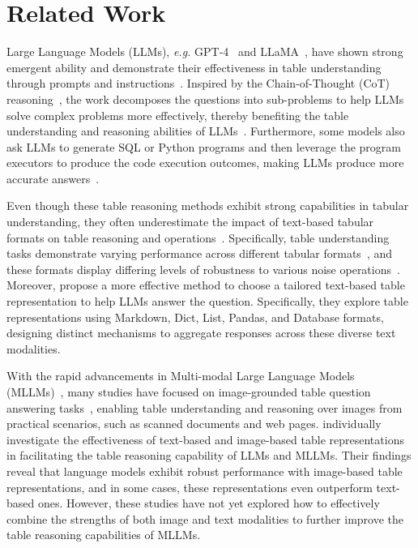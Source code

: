 \section{Related Work}
Large Language Models (LLMs), \textit{e.g.} GPT-4~\cite{openai2023gpt} and LLaMA~\cite{touvron2023llama}, have shown strong emergent ability and demonstrate their effectiveness in table understanding through prompts and instructions~\cite{chen2023large,wang2024chainoftable}. Inspired by the Chain-of-Thought (CoT) reasoning~\cite{wei2022chain}, the work decomposes the questions into sub-problems to help LLMs solve complex problems more effectively, thereby benefiting the table understanding and reasoning abilities of LLMs~\cite{zhou2022least,wang2024chainoftable,cheng2023binding}. Furthermore, some models also ask LLMs to generate SQL or Python programs and then leverage the program executors to produce the code execution outcomes, making LLMs produce more accurate answers~\cite{cheng2023binding,ye2023large,gao2023pal,ni2023lever}.

Even though these table reasoning methods exhibit strong capabilities in tabular understanding, they often underestimate the impact of text-based tabular formats on table reasoning and operations~\cite{sui2024table,singha2023tabular}. Specifically, table understanding tasks demonstrate varying performance across different tabular formats~\cite{sui2024table}, and these formats display differing levels of robustness to various noise operations~\cite{singha2023tabular}. Moreover, \citet{zhang2024flextaf} propose a more effective method to choose a tailored text-based table representation to help LLMs answer the question. Specifically, they explore table representations using Markdown, Dict, List, Pandas, and Database formats, designing distinct mechanisms to aggregate responses across these diverse text modalities.



With the rapid advancements in Multi-modal Large Language Models (MLLMs)~\cite{yao2024minicpm,bai2023qwen,liu2024improved}, many studies have focused on image-grounded table question answering tasks~\cite{kim2024tablevqa,ZhengFSS0J024}, enabling table understanding and reasoning over images from practical scenarios, such as scanned documents and web pages. \citet{deng2024tables} individually investigate the effectiveness of text-based and image-based table representations in facilitating the table reasoning capability of LLMs and MLLMs. Their findings reveal that language models exhibit robust performance with image-based table representations, and in some cases, these representations even outperform text-based ones. However, these studies have not yet explored how to effectively combine the strengths of both image and text modalities to further improve the table reasoning capabilities of MLLMs.
